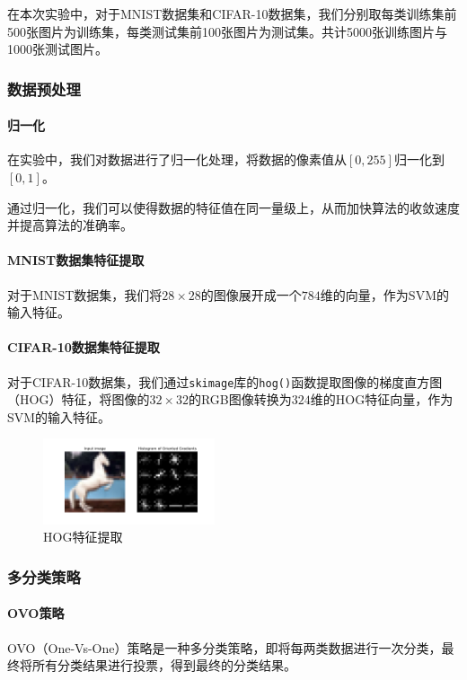 \documentclass[a4paper]{article}
\begin{document}
在本次实验中，对于MNIST数据集和CIFAR-10数据集，我们分别取每类训练集前500张图片为训练集，每类测试集前100张图片为测试集。共计5000张训练图片与1000张测试图片。

\subsubsection{数据预处理}
\paragraph*{归一化}
在实验中，我们对数据进行了归一化处理，将数据的像素值从$[0, 255]$归一化到$[0, 1]$。

通过归一化，我们可以使得数据的特征值在同一量级上，从而加快算法的收敛速度并提高算法的准确率。

\paragraph*{MNIST数据集特征提取}
对于MNIST数据集，我们将$28\times28$的图像展开成一个$784$维的向量，作为SVM的输入特征。

\paragraph*{CIFAR-10数据集特征提取}
对于CIFAR-10数据集，我们通过\verb|skimage|库的\verb|hog()|函数提取图像的梯度直方图（HOG）特征，将图像的$32\times32$的RGB图像转换为$324$维的HOG特征向量，作为SVM的输入特征。

\begin{figure}[H]
    \centering
    \includegraphics[width=0.45\textwidth]{pictures/hog.png}
    \caption{HOG特征提取}
\end{figure}

\subsubsection{多分类策略}
\paragraph*{OVO策略}
OVO（One-Vs-One）策略是一种多分类策略，即将每两类数据进行一次分类，最终将所有分类结果进行投票，得到最终的分类结果。
\end{document}
